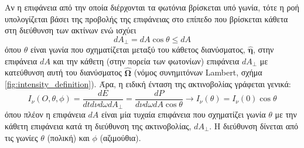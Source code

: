 Αν η επιφάνεια από την οποία διέρχονται τα φωτόνια βρίσκεται υπό γωνία, τότε η ροή υπολογίζεται βάσει της προβολής της επιφάνειας στο επίπεδο που βρίσκεται κάθετα στη διεύθυνση των ακτίνων ενώ ισχύει $$dA_{\perp} = dA \cos \theta \leq dA$$ όπου $\theta$ είναι γωνία που σχηματίζεται μεταξύ του κάθετος διανύσματος, $\boldsymbol{\hat{\eta}}$, στην επιφάνεια $dA$ και την κάθετη (στην πορεία των φωτονίων) επιφάνεια $dA_{\perp}$ με κατεύθυνση αυτή του διανύσματος $\boldsymbol{\hat{\Omega}}$ (νόμος συνημιτόνων Lambert, σχήμα \ref{fig:intensity_definition}). Άρα, η ειδική ένταση της ακτινοβολίας γράφεται γενικά:
\begin{equation}
    \label{eq:specific_intensity_def}
    I_{\nu}(O, \theta, \phi) = \frac{dE}{dt d\nu d\omega dA_{\perp}} = \frac{dP}{d\nu d\omega dA \cos \theta} \longrightarrow I_{\nu}(\theta) = I_{\nu}(0)\cos \theta
\end{equation}
όπου πλέον η επιφάνεια $dA$ είναι μία τυχαία επιφάνεια που σχηματίζει γωνία $\theta$ με την κάθετη επιφάνεια κατά τη διεύθυνση της ακτινοβολίας, $dA_{\perp}$. Η διεύθυνση δίνεται από τις γωνίες $\theta$ (πολική) και $\phi$ (αζιμούθια).

